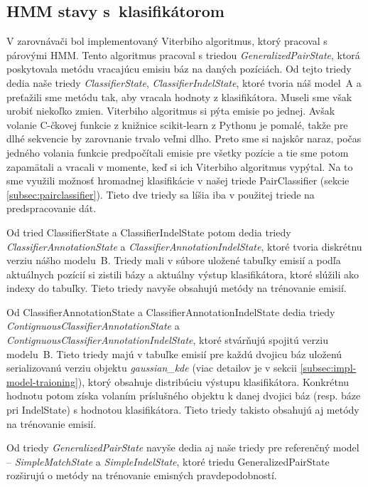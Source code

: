\subsection{HMM stavy s~klasifikátorom}
\label{subsec:hmm-states}

V zarovnávači bol implementovaný Viterbiho algoritmus, ktorý pracoval s párovými HMM. Tento algoritmus pracoval s triedou \textit{GeneralizedPairState}, ktorá poskytovala metódu  vracajúcu emisiu báz na daných pozíciách. Od tejto triedy dedia naše triedy \textit{ClassifierState}, \textit{ClassifierIndelState}, ktoré tvoria náš model~A a preťažili sme metódu  tak, aby vracala hodnoty z klasifikátora. Museli sme však urobiť niekoľko zmien. Viterbiho algoritmus si pýta emisie po jednej. Avšak volanie C-čkovej funkcie z knižnice scikit-learn z Pythonu je pomalé, takže pre dlhé sekvencie by zarovnanie trvalo veľmi dlho. Preto sme si najskôr naraz, počas jedného volania funkcie predpočítali emisie pre všetky pozície a tie sme potom zapamätali a vracali v momente, keď si ich Viterbiho algoritmus vypýtal. Na to sme využili možnosť hromadnej klasifikácie v našej triede PairClassifier (sekcie \ref{subsec:pairclassifier}). Tieto dve triedy sa líšia iba v použitej triede na predspracovanie dát.

Od tried ClassifierState a ClassifierIndelState potom dedia triedy \textit{ClassifierAnnotationState} a \textit{ClassifierAnnotationIndelState}, ktoré tvoria diskrétnu verziu nášho modelu~B. Triedy mali v súbore uložené tabuľky emisií a podľa aktuálnych pozícií si zistili bázy a aktuálny výstup klasifikátora, ktoré slúžili ako indexy do tabuľky. Tieto triedy navyše obsahujú metódy na trénovanie emisií.

Od ClassifierAnnotationState a ClassifierAnnotationIndelState dedia triedy \textit{ContignuousClassifierAnnotationState} a \textit{ContignuousClassifierAnnotationIndelState}, ktoré stvárňujú spojitú verziu modelu~B. Tieto triedy majú v tabuľke emisií pre každú dvojicu báz uloženú serializovanú verziu objektu \textit{gaussian\_kde} (viac detailov je v sekcii \ref{subsec:impl-model-traioning}), ktorý obsahuje distribúciu výstupu klasifikátora. Konkrétnu hodnotu potom získa volaním príslušného objektu k danej dvojici báz (resp. báze pri IndelState) s hodnotou klasifikátora. Tieto triedy takisto obsahujú aj metódy na trénovanie emisií.

Od triedy \textit{GeneralizedPairState} navyše dedia aj naše triedy pre referenčný model -- \textit{SimpleMatchState} a \textit{SimpleIndelState}, ktoré triedu GeneralizedPairState rozširujú o metódy na trénovanie emisných pravdepodobností.

